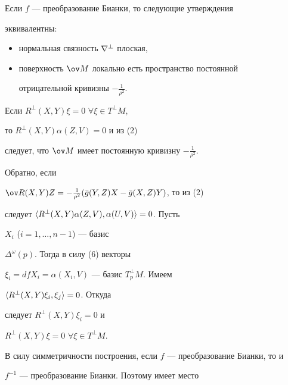  


\begin{cor} Если $f$ --- преобразование Бианки, то следующие утверждения 


эквивалентны: 


\begin{itemize} 


\item[1)] нормальная связность $\nabla^\bot$ плоская, 


\item[2)] поверхность $\ov M$ локально есть пространство постоянной 


отрицательной кривизны $-\frac{1}{\rho^2}$. 


\end{itemize} 


\end{cor} 


 


\begin{pf} Если $R^\bot(X,Y)\xi=0$ $\forall\xi\in T^\bot M$, 


то $R^\bot(X,Y)\alpha(Z,V)=0$ и из (2) 


следует, что $\ov M$ имеет постоянную кривизну $-\frac{1}{\rho^2}$. 


Обратно, если 


$\ov R(X,Y)Z=-\frac{1}{\rho^2}(\Bar g(Y,Z)X-\Bar g(X,Z)Y)$, то из (2) 


следует $\langle R^\bot(X,Y)\alpha(Z,V),\alpha(U,V)\rangle=0$. Пусть 


$X_i$ ($i=1,\dotsc,n-1$) --- базис 


$\Delta^\omega(p)$. Тогда в силу (6) векторы 


$\xi_i=dfX_i=\alpha(X_i,V)$ --- базис $T_p^\bot M$. Имеем 


$\langle R^\bot(X,Y)\xi_i,\xi_j\rangle=0$. Откуда 


следует $R^\bot(X,Y)\xi_i=0$ и 


$R^\bot(X,Y)\xi=0$ $\forall\xi\in T^\bot M$. 


\end{pf} 


 


В силу симметричности построения, если $f$ --- преобразование Бианки, то и 


$f^{-1}$ --- преобразование Бианки. Поэтому имеет место 


 


